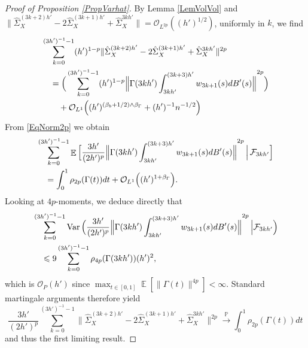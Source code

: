 \documentclass[preprint,aos]{imsart}
\numberwithin{equation}{section}
\theoremstyle{remark}
\DeclareMathOperator{\E}{{\mathbb E}}
\DeclareMathOperator{\PP}{{\mathbb P}}
\DeclareMathOperator{\Var}{Var} \DeclareMathOperator{\Cov}{Cov}
\providecommand{\norm}[1]{\lVert #1 \rVert}
\providecommand{\bnorm}[1]{{\Bigl\lVert #1 \Bigr\rVert}}
\renewcommand{\le}{\leqslant}
\begin{document}
\begin{appendix}
\begin{proof}[Proof of Proposition \ref{PropVarhat}]
By Lemma \ref{LemVolVol} and $\norm{\hat\Sigma_X^{(3k+2)h'}-2\hat\Sigma_X^{(3k+1)h'}+\hat\Sigma_X^{3kh'}}={\mathcal O}_{L^{2p}}((h')^{1/2})$, uniformly in $k$, we find
\begin{align*}
&\sum_{k=0}^{(3h')^{-1}-1} (h')^{1-p} \norm{\hat\Sigma_X^{(3k+2)h'}-2\hat\Sigma_X^{(3k+1)h'}+\hat\Sigma_X^{3kh'}}^{2p}\\
&\quad= \Big(\sum_{k=0}^{(3h')^{-1}-1} (h')^{1-p}\bnorm{\Gamma(3kh')\int_{3kh'}^{(3k+3)h'}w_{3k+1}(s)dB'(s)}^{2p}\Big)\\
&\qquad+{\mathcal O}_{L^1}\Big((h')^{(\beta_b+1/2)\wedge \beta_\Gamma}+(h')^{-1}n^{-1/2}\Big)
\end{align*}
From \eqref{EqNorm2p} we  obtain
\begin{align*} &\sum_{k=0}^{(3h')^{-1}-1}  \E\Big[\frac{3h'}{(2h')^p}\bnorm{\Gamma(3kh')\int_{3kh'}^{(3k+3)h'}w_{3k+1}(s)dB'(s)}^{2p}\,\Big|\,{\mathcal F}_{3kh'}\Big]\\
&\quad= \int_0^1\rho_{2p}(\Gamma(t))dt+{\mathcal O}_{L^1}\Big((h')^{1+\beta_\Gamma}\Big).
\end{align*}
Looking at $4p$-moments, we deduce directly that
\begin{align*}
&\sum_{k=0}^{(3h')^{-1}-1}\Var\Big(\frac{3h'}{(2h')^p} \bnorm{\Gamma(3kh')\int_{3kh'}^{(3k+3)h'}w_{3k+1}(s)dB'(s)}^{2p}\,\Big|{\mathcal F}_{3kh'}\Big)\\
&\quad \le  9\sum_{k=0}^{(3h')^{-1}-1}\rho_{4p}(\Gamma(3kh'))(h')^2,
\end{align*}
which is ${\mathcal O}_P(h')$ since $\max_{t\in[0,1]}\E[\norm{\Gamma(t)}^{4p}]<\infty$. Standard martingale arguments \cite[Lemma 2.2.11(a)]{JacPro2011} therefore yield
\[\frac{3h'}{(2h')^p}\sum_{k=0}^{(3h')^{-1}-1} \norm{\hat\Sigma_X^{(3k+2)h'}-2\hat\Sigma_X^{(3k+1)h'}+\hat\Sigma_X^{3kh'}}^{2p} \xrightarrow{\PP} \int_0^1\rho_{2p}(\Gamma(t))dt
\]
and thus  the first limiting result.


\end{proof}
\end{appendix}
\end{document}
